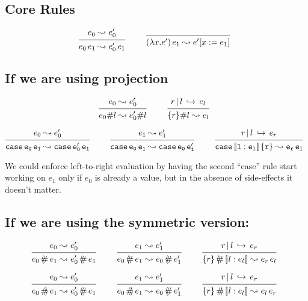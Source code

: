 \documentclass{article}
\newcommand{\define}{::=}
\newcommand{\variant}[1]{[\!|#1|\!]}
\newcommand{\case}[2]{\tt{case}\,#1\,#2}
\newcommand{\app}[2]{#1\,#2}
\newcommand{\lam}[2]{\lambda #1 . #2}
\newcommand{\projFun}{\,\langle\!\!\#\,}
\newcommand{\projArg}{\,\#\!\!\rangle\,}
\newcommand{\haslbltm}[3]{#1\,|\,#2\,\hookrightarrow\, #3}
\newcommand{\step}[2]{#1 \leadsto #2}
\newcommand{\deduct}[3][]
{
  \begin{prooftree}
    \hypo{#2}
    \infer1[\text{#1}]{#3}
  \end{prooftree}
}
\begin{document}


\subsection{Core Rules}
\[
\deduct
    {\step{e_0}{e'_0}}
    {\step{\app{e_0}{e_1}}{\app{e'_0}{e_1}}}
    {}
\qquad
\deduct
    {}
    {\step{\app{(\lam{x}{e'})}{e_1}}{e'[x:=e_1]}}
    {}
\]

\subsection{If we are using projection}

\[
\deduct
    {\step{e_0}{e'_0}}
    {\step{e_0\#l}{e'_0\#l}}
    {}
\qquad
\deduct
    {\haslbltm{r}{l}{e_l}}
    {\step{\{r\}\#l}{e_l}}
    {}
\]

\[
\deduct
    {\step{e_0}{e'_0}}
    {\step{\case{e_0}{e_1}}{\case{e'_0}{e_1}}}
    {}
\qquad
\deduct
    {\step{e_1}{e'_1}}
    {\step{\case{e_0}{e_1}}{\case{e_0}{e'_1}}}
    {}
\qquad
\deduct
    {\haslbltm{r}{l}{e_r}}
    {\step{\case{\variant{l:e_l}}{\{r\}}}{\app{e_r}{e_l}}}
    {}
\]

We could enforce left-to-right evaluation by having the second ``case'' rule
start working on $e_1$ only if $e_0$
is already a value, but in the absence of side-effects it doesn't matter.

\subsection{If we are using the symmetric version:}

\[
\deduct
   {\step{e_0}{e'_0}}
   {\step{e_0 \projFun e_1}{e'_0 \projFun e_1}}
   {}
\qquad
\deduct
   {\step{e_1}{e'_1}}
   {\step{e_0 \projFun e_1}{e_0 \projFun e'_1}}
   {}
\qquad
\deduct
   {\haslbltm{r}{l}{e_r}}
   {\step{\{r\} \projFun \variant{l:e_l}}{\app{e_r}{e_l}}}
   {}
\]

\[
\deduct
   {\step{e_0}{e'_0}}
   {\step{e_0 \projArg e_1}{e'_0 \projFun e_1}}
   {}
\qquad
\deduct
   {\step{e_1}{e'_1}}
   {\step{e_0 \projArg e_1}{e_0 \projFun e'_1}}
   {}
\qquad
\deduct
   {\haslbltm{r}{l}{e_r}}
   {\step{\{r\} \projArg \variant{l:e_l}}{\app{e_l}{e_r}}}
   {}
\]
\end{document}
